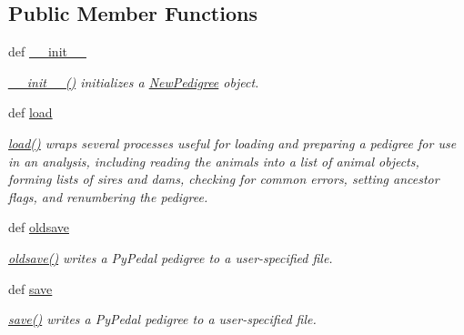 \subsection*{Public Member Functions}
\begin{DoxyCompactItemize}
\item 
def \hyperlink{classPyPedal_1_1pyp__newclasses_1_1NewPedigree_ad6a2650eb959399a93d9c445b53a5b10}{\_\-\_\-init\_\-\_\-}
\begin{DoxyCompactList}\small\item\em \hyperlink{classPyPedal_1_1pyp__newclasses_1_1NewPedigree_ad6a2650eb959399a93d9c445b53a5b10}{\_\-\_\-init\_\-\_\-()} initializes a \hyperlink{classPyPedal_1_1pyp__newclasses_1_1NewPedigree}{NewPedigree} object. \item\end{DoxyCompactList}\item 
def \hyperlink{classPyPedal_1_1pyp__newclasses_1_1NewPedigree_a6f00326b1b20146f6c7ac15596a58448}{load}
\begin{DoxyCompactList}\small\item\em \hyperlink{classPyPedal_1_1pyp__newclasses_1_1NewPedigree_a6f00326b1b20146f6c7ac15596a58448}{load()} wraps several processes useful for loading and preparing a pedigree for use in an analysis, including reading the animals into a list of animal objects, forming lists of sires and dams, checking for common errors, setting ancestor flags, and renumbering the pedigree. \item\end{DoxyCompactList}\item 
def \hyperlink{classPyPedal_1_1pyp__newclasses_1_1NewPedigree_ab7599a24c35efdfcd2caacae10f59ea2}{oldsave}
\begin{DoxyCompactList}\small\item\em \hyperlink{classPyPedal_1_1pyp__newclasses_1_1NewPedigree_ab7599a24c35efdfcd2caacae10f59ea2}{oldsave()} writes a PyPedal pedigree to a user-\/specified file. \item\end{DoxyCompactList}\item 
def \hyperlink{classPyPedal_1_1pyp__newclasses_1_1NewPedigree_ab2c07236058bb89d5318a7453cb6db29}{save}
\begin{DoxyCompactList}\small\item\em \hyperlink{classPyPedal_1_1pyp__newclasses_1_1NewPedigree_ab2c07236058bb89d5318a7453cb6db29}{save()} writes a PyPedal pedigree to a user-\/specified file. \item\end{DoxyCompactList}\item 

\end{DoxyCompactItemize}
